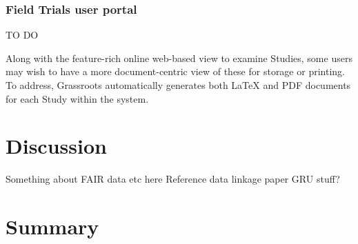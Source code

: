 \documentclass[9pt,a4paper]{extarticle}
\begin{document}
\subsubsection*{Field Trials user portal}

TO DO


Along with the feature-rich online web-based view to examine Studies, some users may wish to have a more document-centric view of these for storage or printing. 
To address, Grassroots automatically generates both LaTeX and PDF documents for each Study within the system.  

\section*{Discussion} %

Something about FAIR data etc here
Reference data linkage paper
GRU stuff?




\section*{Summary} %

\end{document}
